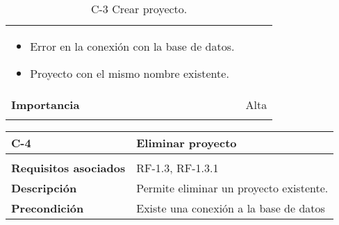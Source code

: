 \begin{longtable}[H]{@{}ll@{}}
\begin{minipage}[t]{0.71\columnwidth}
\begin{itemize}
\item
Error en la conexión con la base de datos.
\item
Proyecto con el mismo nombre existente.
\end{itemize}\strut
\end{minipage}\tabularnewline
\begin{minipage}[t]{0.23\columnwidth}\raggedright\strut
\textbf{Importancia}\strut
\end{minipage} & \begin{minipage}[t]{0.71\columnwidth}\raggedright\strut
Alta\strut
\end{minipage}\tabularnewline
\bottomrule
\caption{C-3 Crear proyecto.}
\end{longtable}

\begin{longtable}[H]{@{}ll@{}}
\toprule
\begin{minipage}[b]{0.23\columnwidth}\raggedright\strut
\textbf{C-4}\strut
\end{minipage} & \begin{minipage}[b]{0.71\columnwidth}\raggedright\strut
\textbf{Eliminar proyecto}\strut
\end{minipage}\tabularnewline
\midrule
\endhead
\tabularnewline
\begin{minipage}[t]{0.23\columnwidth}\raggedright\strut
\textbf{Requisitos asociados}\strut
\end{minipage} & \begin{minipage}[t]{0.71\columnwidth}\raggedright\strut
RF-1.3, RF-1.3.1\strut
\end{minipage}\tabularnewline
\begin{minipage}[t]{0.23\columnwidth}\raggedright\strut
\textbf{Descripción}\strut
\end{minipage} & \begin{minipage}[t]{0.71\columnwidth}\raggedright\strut
Permite eliminar un proyecto existente.\strut
\end{minipage}\tabularnewline
\begin{minipage}[t]{0.23\columnwidth}\raggedright\strut
\textbf{Precondición}\strut
\end{minipage} & \begin{minipage}[t]{0.71\columnwidth}\raggedright\strut
Existe una conexión a la base de datos


\end{minipage}
\end{longtable}
